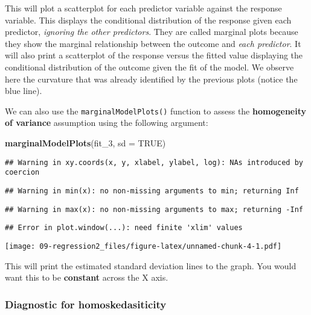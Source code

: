 \documentclass[
]{book}
\newenvironment{Shaded}{\begin{snugshade}}{\end{snugshade}}
\newcommand{\AttributeTok}[1]{\textcolor[rgb]{0.13,0.29,0.53}{#1}}
\newcommand{\ConstantTok}[1]{\textcolor[rgb]{0.56,0.35,0.01}{#1}}
\newcommand{\FunctionTok}[1]{\textcolor[rgb]{0.13,0.29,0.53}{\textbf{#1}}}
\newcommand{\NormalTok}[1]{#1}
\begin{document}
This will plot a scatterplot for each predictor variable against the response variable. This displays the conditional distribution of the response given each predictor, \emph{ignoring the other predictors}. They are called marginal plots because they show the marginal relationship between the outcome and \emph{each predictor}. It will also print a scatterplot of the response versus the fitted value displaying the conditional distribution of the outcome given the fit of the model. We observe here the curvature that was already identified by the previous plots (notice the blue line).

We can also use the \texttt{marginalModelPlots()} function to assess the \textbf{homogeneity of variance} assumption using the following argument:

\begin{Shaded}
\begin{Highlighting}[]
\FunctionTok{marginalModelPlots}\NormalTok{(fit\_3, }\AttributeTok{sd =} \ConstantTok{TRUE}\NormalTok{)}
\end{Highlighting}
\end{Shaded}

\begin{verbatim}
## Warning in xy.coords(x, y, xlabel, ylabel, log): NAs introduced by coercion
\end{verbatim}

\begin{verbatim}
## Warning in min(x): no non-missing arguments to min; returning Inf
\end{verbatim}

\begin{verbatim}
## Warning in max(x): no non-missing arguments to max; returning -Inf
\end{verbatim}

\begin{verbatim}
## Error in plot.window(...): need finite 'xlim' values
\end{verbatim}

\texttt{[image: 09-regression2\_files/figure-latex/unnamed-chunk-4-1.pdf]}

This will print the estimated standard deviation lines to the graph. You would want this to be \textbf{constant} across the X axis.

\subsubsection{Diagnostic for homoskedasiticity}\label{diagnostic-for-homoskedasiticity}
\end{document}
